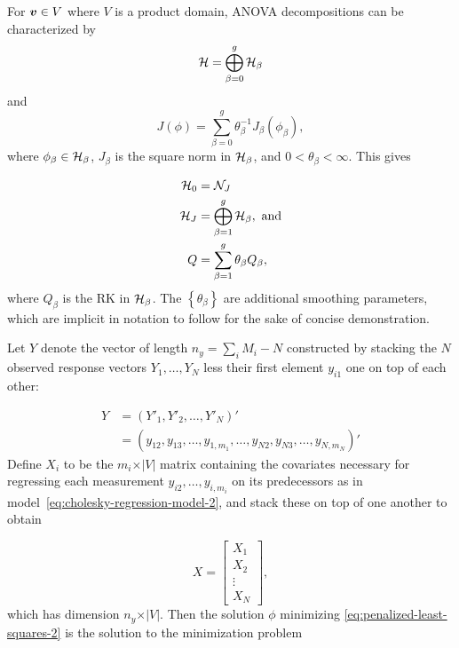 \bigskip

\bigskip

For $\mbox{\boldmath $v$} \in V$ where $V$ is a product domain, ANOVA decompositions can be characterized by 
\begin{equation}\label{eq:ssanova-decomposition-of-RKHS}
\mathcal{H} = \bigoplus\limits_{\beta=0}^{g} \mathcal{H}_\beta
\end{equation}
\noindent
and
\begin{equation}\label{eq:ssanova-decomposition-of-penalty}
J\left(\phi\right) = \sum_{\beta=0}^{g} \theta^{-1}_\beta J_\beta \left( \phi_\beta \right),
\end{equation}
\noindent
where $\phi_\beta \in \mathcal{H}_\beta$, $J_\beta$ is the square norm in $\mathcal{H}_\beta$, and $0 < \theta_\beta < \infty$. This gives 

\begin{align*}
\mathcal{H}_0 &= \mathcal{N}_J \\
\mathcal{H}_J &= \bigoplus\limits_{\beta=1}^{g} \mathcal{H}_\beta, \mbox{ and} \\
Q &= \sum_{\beta=1}^g \theta_\beta Q_\beta,
\end{align*}
\noindent
where $Q_\beta$ is the RK in $\mathcal{H}_\beta$. The $\left \{ \theta_\beta \right\}$ are additional smoothing parameters, which are implicit in notation to follow for the sake of concise demonstration. 

\bigskip

\bigskip


\bigskip
\noindent
Let $Y$ denote the vector of length $n_y= \sum_{i} M_i - N$  constructed by stacking the $N$ observed response vectors $Y_1,\dots, Y_N$ less their first element $y_{i1}$ one on top of each other:

\begin{align*}
Y &= \left( Y'_1, Y'_2, \dots, Y'_{N} \right)'\\
 &= \left( y_{12}, y_{13},\dots, y_{1,m_1}, \dots, y_{N2}, y_{N3},\dots, y_{N,m_N} \right)'
\end{align*}
\noindent
Define $X_i$ to be the $m_i \times \vert V \vert$ matrix containing the covariates necessary for regressing each measurement $y_{i2}, \dots, y_{i,m_i}$ on its predecessors as in model~\ref{eq:cholesky-regression-model-2}, and stack these on top of one another to obtain

\begin{equation} \label{eq:ar-design-matrix-1}
X = \begin{bmatrix}
X_1 \\
X_2\\
\vdots \\
X_N
\end{bmatrix},
\end{equation}
\noindent
which has dimension $n_y \times \vert V \vert$. Then the solution $\phi$  minimizing \ref{eq:penalized-least-squares-2}  is the solution to the minimization problem

